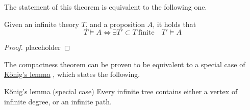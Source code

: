 \documentclass[a4paper, 12pt]{report}
\begin{document}
    The statement of this theorem is equivalent to the following one.

    \begin{framedcor}{}
        Given an infinite theory $T$, and a proposition $A$, it holds that $$T \models A \iff \exists T' \subset T \ \mathrm{finite} \quad T' \models A$$
    \end{framedcor}

    \begin{proof}
        placeholder 
    \end{proof}
   
    The compactness theorem can be proven to be equivalent to a special case of \href{https://en.wikipedia.org/wiki/K%C5%91nig%27s_lemma}{Kőnig's lemma} \cite{koenig}, which states the following.

    \begin{framedlem}{Kőnig's lemma (special case)}
        Every infinite tree contains either a vertex of infinite degree, or an infinite path.
    \end{framedlem}

    \printbibliography %
\end{document}
